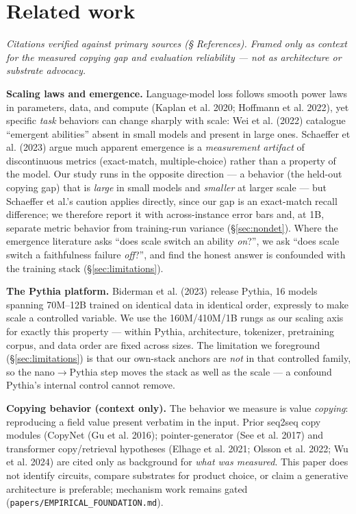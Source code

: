 \documentclass[11pt]{article}
\begin{document}
\section{Related work}\label{sec:related}

\emph{Citations verified against primary sources (§ References). Framed only as context for the measured copying gap and evaluation reliability --- not as architecture or substrate advocacy.}

\textbf{Scaling laws and emergence.} Language-model loss follows smooth power laws in parameters, data, and compute ({Kaplan et al.} 2020; {Hoffmann et al.} 2022), yet specific \emph{task} behaviors can change sharply with scale: {Wei et al.} (2022) catalogue ``emergent abilities'' absent in small models and present in large ones. Schaeffer et al. (2023) argue much apparent emergence is a \emph{measurement artifact} of discontinuous metrics (exact-match, multiple-choice) rather than a property of the model. Our study runs in the opposite direction --- a behavior (the held-out copying gap) that is \emph{large} in small models and \emph{smaller} at larger scale --- but Schaeffer et al.'s caution applies directly, since our gap is an exact-match recall difference; we therefore report it with across-instance error bars and, at 1B, separate metric behavior from training-run variance (\S\ref{sec:nondet}). Where the emergence literature asks ``does scale switch an ability \emph{on}?'', we ask ``does scale switch a faithfulness failure \emph{off}?'', and find the honest answer is confounded with the training stack (\S\ref{sec:limitations}).

\textbf{The Pythia platform.} {Biderman et al.} (2023) release Pythia, 16 models spanning 70M--12B trained on identical data in identical order, expressly to make scale a controlled variable. We use the 160M/410M/1B rungs as our scaling axis for exactly this property --- within Pythia, architecture, tokenizer, pretraining corpus, and data order are fixed across sizes. The limitation we foreground (\S\ref{sec:limitations}) is that our own-stack anchors are \emph{not} in that controlled family, so the nano$\rightarrow$Pythia step moves the stack as well as the scale --- a confound Pythia's internal control cannot remove.

\textbf{Copying behavior (context only).} The behavior we measure is value \emph{copying}: reproducing a field value present verbatim in the input. Prior seq2seq copy modules (CopyNet (Gu et al. 2016); pointer-generator (See et al. 2017) and transformer copy/retrieval hypotheses ({Elhage et al.} 2021; {Olsson et al.} 2022; Wu et al. 2024) are cited only as background for \emph{what was measured}. This paper does not identify circuits, compare substrates for product choice, or claim a generative architecture is preferable; mechanism work remains gated (\texttt{papers/EMPIRICAL\_FOUNDATION.md}).
\end{document}
